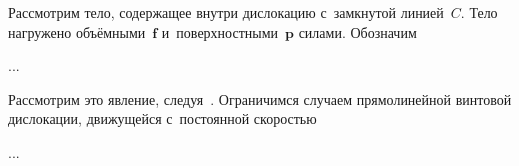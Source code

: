 

\label{para:actionofstressfieldondislocation}

\begin{otherlanguage}{russian}

Рассмотрим тело, содержащее внутри дислокацию с~замкнутой линией~$C$. Тело нагружено объёмными~$\bm{f}$ и~поверхностными~$\bm{p}$ силами. Обозначим

...



\end{otherlanguage}



\label{para:dislocationmovement}

\begin{otherlanguage}{russian}

Рассмотрим это явление, следуя~\cite{cottrell-dislocations}. Ограничимся случаем прямо\-линейной винтовой дислокации, движущейся с~постоянной скоростью

...



\end{otherlanguage}



